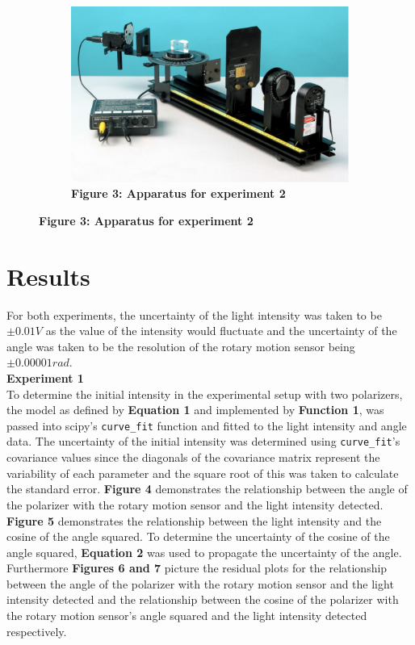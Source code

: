 \documentclass[
	letterpaper, %
	10pt, %
]{CSUniSchoolLabReport}
\begin{document}
\begin{figure}[H]
	\centering
	\begin{subfigure}{0.45\textwidth}
		\includegraphics[width=\textwidth]{../figures/experimentTwoApparatus.png}
		\caption{\textbf{Figure 3: Apparatus for experiment 2}}
	\end{subfigure}
\end{figure}
\section{Results}
For both experiments, the uncertainty of the light intensity was taken to be $\pm 0.01 V$ as the value of the intensity would fluctuate
and the uncertainty of the angle was taken to be the resolution of the rotary motion sensor being
$\pm 0.00001rad$. \\

\textbf{Experiment 1}\\

To determine the initial intensity in the experimental setup with two polarizers, the model as defined
by \textbf{Equation 1} and implemented by \textbf{Function 1}, was passed into scipy's \lstinline{curve_fit} function and
fitted to the light intensity and angle data. The uncertainty of the initial intensity was determined
using \lstinline{curve_fit}'s covariance values since the diagonals of the covariance matrix represent
the variability of each parameter and the square root of this was taken to calculate the standard error.
\textbf{Figure 4} demonstrates the relationship between the angle of the polarizer with the rotary motion sensor
and the light intensity detected.\\
\textbf{Figure 5} demonstrates the relationship between the light intensity and the cosine of the angle squared.
To determine the uncertainty of the cosine of the angle squared, \textbf{Equation 2} was used to propagate the
uncertainty of the angle. Furthermore \textbf{Figures 6 and 7} picture the
residual plots for the relationship between the angle of the polarizer with the rotary motion sensor
and the light intensity detected and the relationship between the cosine of the polarizer with the
rotary motion sensor's angle squared and the light intensity detected respectively.
\end{document}
